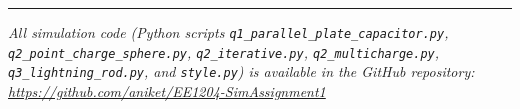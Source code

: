\documentclass[11pt,a4paper]{article}
\begin{document}
\vspace{1cm}
\noindent\rule{\textwidth}{0.5pt}
\begin{center}
\small\itshape
All simulation code (Python scripts \texttt{q1\_parallel\_plate\_capacitor.py}, \texttt{q2\_point\_charge\_sphere.py}, \texttt{q2\_iterative.py}, \texttt{q2\_multicharge.py}, \texttt{q3\_lightning\_rod.py}, and \texttt{style.py}) is available in the GitHub repository:\\[3mm]
\url{https://github.com/aniket/EE1204-SimAssignment1}\\[2mm]

\end{center}
\end{document}
